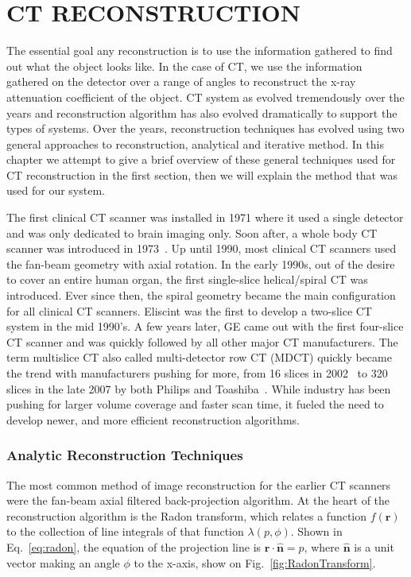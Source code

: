 \chapter{CT RECONSTRUCTION}
\label{chap:reconstruction}

The essential goal any reconstruction is to use the information gathered to find out what the object looks like.  In the case of CT, we use the information gathered on the detector over a range of angles to reconstruct the x-ray attenuation coefficient of the object.  CT system as evolved tremendously over the years and reconstruction algorithm has also evolved dramatically to support the types of systems. Over the years, reconstruction techniques has evolved using two general approaches to reconstruction, analytical and iterative method.  In this chapter we attempt to give a brief overview of these general techniques used for CT reconstruction in the first section, then we will explain the method that was used for our system.

The first clinical CT scanner was installed in 1971 where it used a single detector and was only dedicated to brain imaging only.  Soon after, a whole body CT scanner was introduced in 1973~\citep{Ulzheimer2009}.  Up until 1990, most clinical CT scanners used the fan-beam geometry with axial rotation.  In the early 1990s, out of the desire to cover an entire human organ, the first single-slice helical/spiral CT was introduced.  Ever since then, the spiral geometry became the main configuration for all clinical CT scanners.  Eliscint was the first to develop a two-slice CT system in the mid 1990's.  A few years later, GE came out with the first four-slice CT scanner and was quickly followed by all other major CT manufacturers.  The term multislice CT also called multi-detector row CT (MDCT) quickly became the trend with manufacturers pushing for more, from 16 slices in 2002~\citep{Impact2002} to 320 slices in the late 2007 by both Philips and Toashiba~\citep{Ulzheimer2009}.  While industry has been pushing for larger volume coverage and faster scan time, it fueled the need to develop newer, and more efficient reconstruction algorithms.

\subsection{Analytic Reconstruction Techniques}

The most common method of image reconstruction for the earlier CT scanners were the fan-beam axial filtered back-projection algorithm.  At the heart of the reconstruction algorithm is the Radon transform, which relates a function $f(\mathbf{r})$ to the collection of line integrals of that function $\lambda(p, \phi)$.  Shown in Eq.~\ref{eq:radon}, the equation of the projection line is $\mathbf{r \cdot \hat{n}} = p$, where $\mathbf{\hat{n}}$ is a unit vector making an angle $\phi$ to the x-axis, show on Fig.~\ref{fig:RadonTransform}.  

